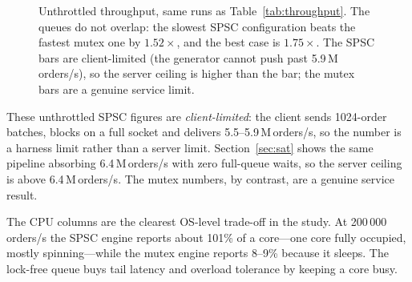 \documentclass[conference]{IEEEtran}
\newcommand{\Mops}{\,M\,orders/s}
\begin{document}
\begin{figure}[!t]
\centering
{}
\caption{Unthrottled throughput, same runs as Table~\ref{tab:throughput}. The
queues do not overlap: the slowest SPSC configuration beats the fastest mutex
one by $1.52\times$, and the best case is $1.75\times$. The SPSC bars are
client-limited (the generator cannot push past 5.9\Mops), so the server ceiling
is higher than the bar; the mutex bars are a genuine service limit.}
\label{fig:tp}
\end{figure}

These unthrottled SPSC figures are \emph{client-limited}: the client sends
1024-order batches, blocks on a full socket and delivers 5.5--5.9\Mops, so the
number is a harness limit rather than a server limit. Section~\ref{sec:sat}
shows the same pipeline absorbing 6.4\Mops{} with zero full-queue waits, so the
server ceiling is above 6.4\Mops. The mutex numbers, by contrast, are a genuine
service result.

The CPU columns are the clearest OS-level trade-off in the study. At
200\,000 orders/s the SPSC engine reports about 101\% of a core---one core fully
occupied, mostly spinning---while the mutex engine reports 8--9\% because it
sleeps. The lock-free queue buys tail latency and overload tolerance by keeping
a core busy.
\end{document}
